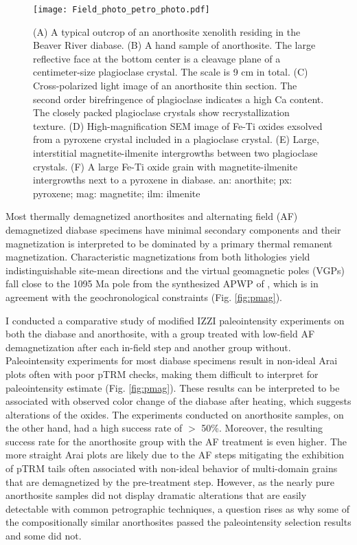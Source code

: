 \documentclass[draft]{agujournal2019}
\begin{document}
  
\begin{figure}
\noindent\texttt{[image: Field\_photo\_petro\_photo.pdf]}
\caption{\small{(A) A typical outcrop of an anorthosite xenolith residing in the Beaver River diabase. (B) A hand sample of anorthosite. The large reflective face at the bottom center is a cleavage plane of a centimeter-size plagioclase crystal. The scale is 9 cm in total. (C) Cross-polarized light image of an anorthosite thin section. The second order birefringence of plagioclase indicates a high Ca content. The closely packed plagioclase crystals show recrystallization texture. (D) High-magnification SEM image of Fe-Ti oxides exsolved from a pyroxene crystal included in a plagioclase crystal. (E) Large, interstitial magnetite-ilmenite intergrowths between two plagioclase crystals. (F) A large Fe-Ti oxide grain with magnetite-ilmenite intergrowths next to a pyroxene in diabase. an: anorthite; px: pyroxene; mag: magnetite; ilm: ilmenite}}
\label{fig:field}
\end{figure}

Most thermally demagnetized anorthosites and alternating field (AF) demagnetized diabase specimens have minimal secondary components and their magnetization is interpreted to be dominated by a primary thermal remanent magnetization. Characteristic magnetizations from both lithologies yield indistinguishable site-mean directions and the virtual geomagnetic poles (VGPs) fall close to the 1095 Ma pole from the synthesized APWP of \cite{Swanson-Hysell2019a}, which is in agreement with the geochronological constraints  (Fig. \ref{fig:pmag}). 

I conducted a comparative study of modified IZZI paleointensity experiments on both the diabase and anorthosite, with a group treated with low-field AF demagnetization after each in-field step and another group without. Paleointensity experiments for most diabase specimens result in non-ideal Arai plots often with poor pTRM checks, making them difficult to interpret for paleointensity estimate (Fig. \ref{fig:pmag}). These results can be interpreted to be associated with observed color change of the diabase after heating, which suggests alterations of the oxides. The experiments conducted on anorthosite samples, on the other hand, had a high success rate of $>$ 50\%. Moreover, the resulting success rate for the anorthosite group with the AF treatment is even higher. The more straight Arai plots are likely due to the AF steps mitigating the exhibition of pTRM tails often associated with non-ideal behavior of multi-domain grains that are demagnetized by the pre-treatment step. However, as the nearly pure anorthosite samples did not display dramatic alterations that are easily detectable with common petrographic techniques, a question rises as why some of the compositionally similar anorthosites passed the paleointensity selection results and some did not. 
\end{document}
